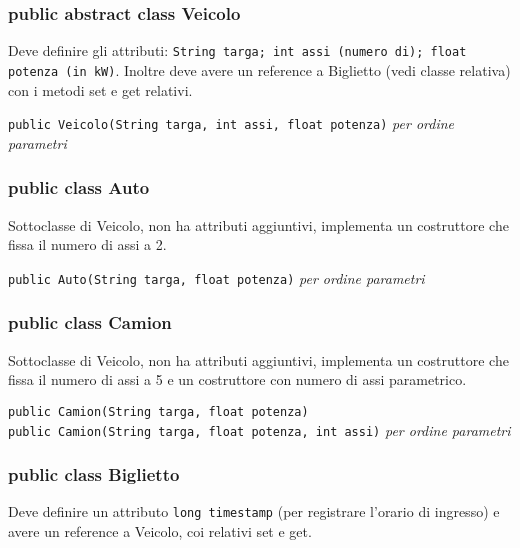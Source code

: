 \documentclass[a4paper,12pt]{article}
\begin{document}
\subsubsection{public abstract class Veicolo}

Deve definire gli attributi:     \texttt{String targa;  int assi (numero di); 
float potenza (in kW)}. Inoltre deve avere un reference a Biglietto (vedi classe 
relativa) con i metodi set e get relativi.

\texttt{public Veicolo(String targa, int assi, float potenza)} \textit{per ordine parametri}



\subsubsection{public class Auto}

Sottoclasse di Veicolo, non ha attributi aggiuntivi, implementa un costruttore 
che fissa il numero di assi a 2.

\texttt{public Auto(String targa, float potenza)} \textit{per ordine parametri}


% 

\subsubsection{public class Camion}


Sottoclasse di Veicolo, non ha attributi aggiuntivi, implementa un costruttore 
che fissa il numero di assi a 5 e un costruttore con numero di assi parametrico.

\texttt{public Camion(String targa, float potenza)\\
public Camion(String targa, float potenza, int assi)} \textit{per ordine parametri}


\subsubsection{public class Biglietto}

Deve definire un attributo  \texttt{long timestamp} (per registrare l'orario di ingresso) e 
avere un reference a Veicolo, coi relativi set e get.
\end{document}
